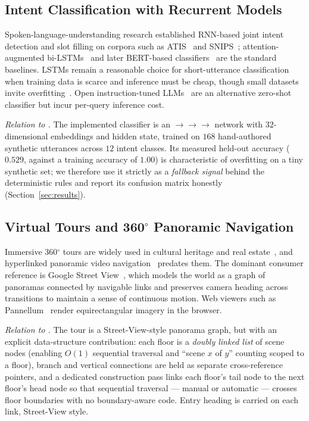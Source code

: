 \subsection{Intent Classification with Recurrent Models}
Spoken-language-understanding research established RNN-based joint intent
detection and slot filling on corpora such as ATIS~\cite{hemphill1990atis}
and SNIPS~\cite{coucke2018snips}; attention-augmented
bi-LSTMs~\cite{liu2016attention} and later BERT-based
classifiers~\cite{chen2019bertintent} are the standard baselines. LSTMs
\cite{hochreiter1997lstm} remain a reasonable choice for short-utterance
classification when training data is scarce and inference must be cheap,
though small datasets invite overfitting~\cite{goodfellow2016deep}. Open
instruction-tuned LLMs~\cite{touvron2023llama2,grattafiori2024llama3} are
an alternative zero-shot classifier but incur per-query inference cost.

\emph{Relation to \system{}.} The implemented classifier is an
$\rightarrow$$\rightarrow$$\rightarrow$
network with $32$-dimensional embeddings and hidden state, trained on
$168$ hand-authored synthetic utterances across $12$ intent classes. Its
measured held-out accuracy ($0.529$, against a training accuracy of
$1.00$) is characteristic of overfitting on a tiny synthetic set; we
therefore use it strictly as a \emph{fallback signal} behind the
deterministic rules and report its confusion matrix honestly
(Section~\ref{sec:results}).

\subsection{Virtual Tours and 360$^{\circ}$ Panoramic Navigation}
Immersive 360$^{\circ}$ tours are widely used in cultural heritage and
real estate~\cite{argyriou2020360design}, and hyperlinked panoramic video
navigation~\cite{neng2010hypervideo} predates them. The dominant
consumer reference is Google Street View~\cite{anguelov2010streetview},
which models the world as a graph of panoramas connected by navigable
links and preserves camera heading across transitions to maintain a sense
of continuous motion. Web viewers such as
Pannellum~\cite{petroff2019pannellum} render equirectangular imagery in the
browser.

\emph{Relation to \system{}.} The tour is a Street-View-style panorama
graph, but with an explicit data-structure contribution: each floor is a
\emph{doubly linked list} of scene nodes (enabling $O(1)$ sequential
traversal and ``scene $x$ of $y$'' counting scoped to a floor), branch and
vertical connections are held as separate cross-reference pointers, and a
dedicated construction pass links each floor's tail node to the next
floor's head node so that sequential traversal --- manual or automatic ---
crosses floor boundaries with no boundary-aware code. Entry heading is
carried on each link, Street-View style.

